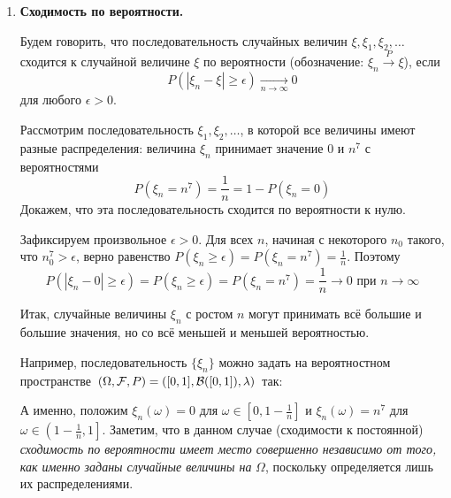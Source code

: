 \begin{enumerate}
	\item \textbf{Сходимость по вероятности.}
	
	Будем говорить, что последовательность случайных величин $\xi, \xi_1, \xi_2, \dots$ сходится к случайной величине $\xi$ по вероятности (обозначение: $\xi_n \overset{P}{\to} \xi$), если
	\[ P(|\xi_n - \xi| \ge \epsilon) \underset{n \to \infty}{\to} 0 \]
	для любого $\epsilon > 0$.
	
	\begin{exmp}
		Рассмотрим последовательность $\xi_1, \xi_2, \dots$, в которой все величины имеют разные распределения: величина $\xi_n$ принимает значение $0$ и $n^7$ с вероятностями
		\[ P(\xi_n = n^7) = \frac{1}{n} = 1 - P(\xi_n = 0) \]
		Докажем, что эта последовательность сходится по вероятности к нулю.
		
		Зафиксируем произвольное $\epsilon > 0$. Для всех $n$, начиная с некоторого $n_0$ такого, что $n_{0}^{7} > \epsilon$, верно равенство $P(\xi_n \ge \epsilon) = P(\xi_n = n^7) = \frac{1}{n}$. Поэтому
		\[ P ( |\xi_n - 0| \ge \epsilon ) = P ( \xi_n \ge \epsilon ) = P ( \xi_n = n^7 ) = \frac{1}{n} \to 0 \text{ при } n \to \infty \]
		
		Итак, случайные величины $\xi_n$ с ростом $n$ могут принимать всё большие и большие значения, но со всё меньшей и меньшей вероятностью.
		
		Например, последовательность $\{ \xi_n \}$ можно задать на вероятностном пространстве $(\Omega, {\mathcal F}, P) = ( [0, 1], {\mathcal{B}}([0, 1]), \lambda )$ так:
		\begin{figure}[H]
		\end{figure}
		А именно, положим $\xi_n (\omega) = 0$ для $\omega \in \left[ 0, 1 - \frac{1}{n} \right]$ и $\xi_n (\omega) = n^7$ для $\omega \in \left( 1 - \frac{1}{n}, 1 \right]$. Заметим, что в данном случае (сходимости к постоянной) \textit{сходимость по вероятности имеет место совершенно независимо от того, как именно заданы случайные величины на} $\Omega$, поскольку определяется лишь их распределениями.
	\end{exmp}
	

\end{enumerate}
